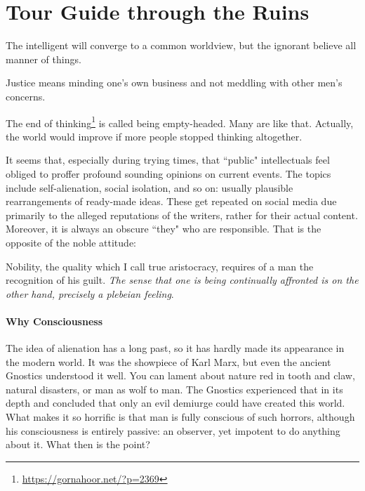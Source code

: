 \section{Tour Guide through the Ruins}

\begin{quotex}
The intelligent will converge to a common worldview, but the ignorant believe all manner of things. 

Justice means minding one's own business and not meddling with other men's concerns. 

The end of thinking\footnote{\url{https://gornahoor.net/?p=2369}} is called being empty-headed. Many are like that. Actually, the world would improve if more people stopped thinking altogether. 

\end{quotex}
It seems that, especially during trying times, that ``public" intellectuals feel obliged to proffer profound sounding opinions on current events. The topics include self-alienation, social isolation, and so on: usually plausible rearrangements of ready-made ideas. These get repeated on social media due primarily to the alleged reputations of the writers, rather for their actual content. Moreover, it is always an obscure ``they" who are responsible. That is the opposite of the noble attitude:

\begin{quotex}
Nobility, the quality which I call true aristocracy, requires of a man the recognition of his guilt. \emph{The sense that one is being continually affronted is on the other hand, precisely a plebeian feeling}.  

\end{quotex}
\paragraph{Why Consciousness}
The idea of alienation has a long past, so it has hardly made its appearance in the modern world. It was the showpiece of Karl Marx, but even the ancient Gnostics understood it well. You can lament about nature red in tooth and claw, natural disasters, or man as wolf to man. The Gnostics experienced that in its depth and concluded that only an evil demiurge could have created this world. What makes it so horrific is that man is fully conscious of such horrors, although his consciousness is entirely passive: an observer, yet impotent to do anything about it. What then is the point?

